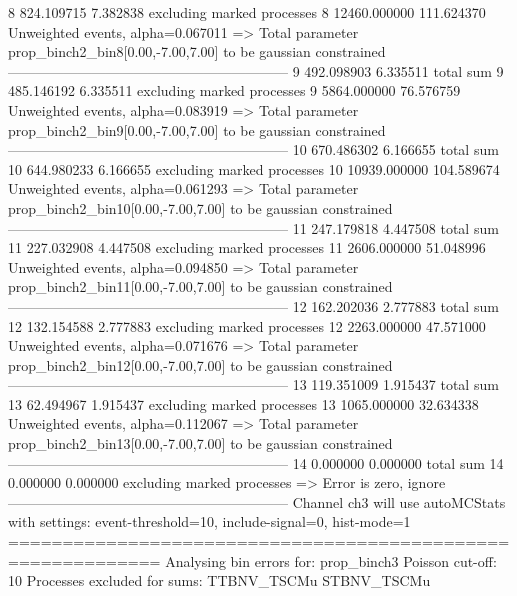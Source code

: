 8          824.109715      7.382838        excluding marked processes    
8          12460.000000    111.624370      Unweighted events, alpha=0.067011
  => Total parameter prop_binch2_bin8[0.00,-7.00,7.00] to be gaussian constrained
------------------------------------------------------------
9          492.098903      6.335511        total sum                     
9          485.146192      6.335511        excluding marked processes    
9          5864.000000     76.576759       Unweighted events, alpha=0.083919
  => Total parameter prop_binch2_bin9[0.00,-7.00,7.00] to be gaussian constrained
------------------------------------------------------------
10         670.486302      6.166655        total sum                     
10         644.980233      6.166655        excluding marked processes    
10         10939.000000    104.589674      Unweighted events, alpha=0.061293
  => Total parameter prop_binch2_bin10[0.00,-7.00,7.00] to be gaussian constrained
------------------------------------------------------------
11         247.179818      4.447508        total sum                     
11         227.032908      4.447508        excluding marked processes    
11         2606.000000     51.048996       Unweighted events, alpha=0.094850
  => Total parameter prop_binch2_bin11[0.00,-7.00,7.00] to be gaussian constrained
------------------------------------------------------------
12         162.202036      2.777883        total sum                     
12         132.154588      2.777883        excluding marked processes    
12         2263.000000     47.571000       Unweighted events, alpha=0.071676
  => Total parameter prop_binch2_bin12[0.00,-7.00,7.00] to be gaussian constrained
------------------------------------------------------------
13         119.351009      1.915437        total sum                     
13         62.494967       1.915437        excluding marked processes    
13         1065.000000     32.634338       Unweighted events, alpha=0.112067
  => Total parameter prop_binch2_bin13[0.00,-7.00,7.00] to be gaussian constrained
------------------------------------------------------------
14         0.000000        0.000000        total sum                     
14         0.000000        0.000000        excluding marked processes    
  => Error is zero, ignore      
------------------------------------------------------------
Channel ch3 will use autoMCStats with settings: event-threshold=10, include-signal=0, hist-mode=1
============================================================
Analysing bin errors for: prop_binch3
Poisson cut-off: 10
Processes excluded for sums: TTBNV_TSCMu STBNV_TSCMu
